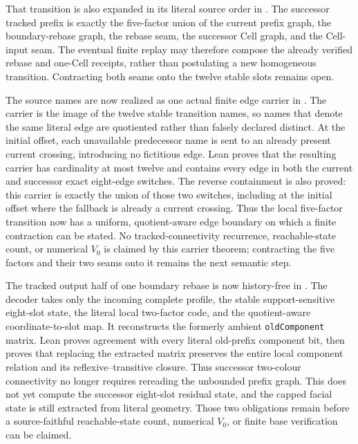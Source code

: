 \documentclass[11pt]{article}
\theoremstyle{definition}
\begin{document}
That transition is also expanded in its literal source order in
.
The successor tracked prefix is exactly the five-factor union of the current
prefix graph, the boundary-rebase graph, the rebase seam, the successor Cell
graph, and the Cell-input seam.  The eventual finite replay may therefore
compose the already verified rebase and one-Cell receipts, rather than
postulating a new homogeneous transition.  Contracting both seams onto the
twelve stable slots remains open.

The source names are now realized as one actual finite edge carrier in
.
The carrier is the image of the twelve stable transition names, so names that
denote the same literal edge are quotiented rather than falsely declared
distinct.  At the initial offset, each unavailable predecessor name is sent
to an already present current crossing, introducing no fictitious edge.
Lean proves that the resulting carrier has cardinality at most twelve and
contains every edge in both the current and successor exact eight-edge
switches.  The reverse containment is also proved: this carrier is exactly
the union of those two switches, including at the initial offset where the
fallback is already a current crossing.  Thus the local five-factor transition now has a uniform,
quotient-aware edge boundary on which a finite contraction can be stated.
No tracked-connectivity recurrence, reachable-state count, or numerical
$V_0$ is claimed by this carrier theorem; contracting the five factors and
their two seams onto it remains the next semantic step.

The tracked output half of one boundary rebase is now history-free in
.
The decoder takes only the incoming complete profile, the stable
support-sensitive eight-slot state, the literal local two-factor code, and
the quotient-aware coordinate-to-slot map.  It reconstructs the formerly
ambient \texttt{oldComponent} matrix.  Lean proves agreement with every
literal old-prefix component bit, then proves that replacing the extracted
matrix preserves the entire local component relation and its
reflexive--transitive closure.  Thus successor two-colour connectivity no
longer requires rereading the unbounded prefix graph.  This does not yet
compute the successor eight-slot residual state, and the capped facial state
is still extracted from literal geometry.  Those two obligations remain
before a source-faithful reachable-state count, numerical $V_0$, or finite
base verification can be claimed.
\end{document}
